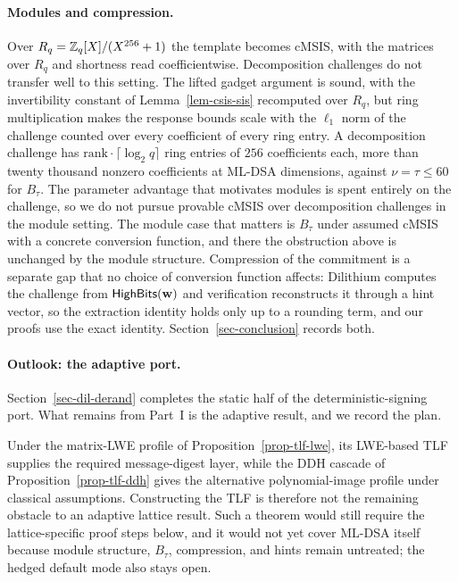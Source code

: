 \paragraph*{Modules and compression.} Over $R_q = \mathbb Z_q[X]/(X^{256}+1)$ the template becomes cMSIS, with the matrices over $R_q$ and shortness read coefficientwise. Decomposition challenges do not transfer well to this setting. The lifted gadget argument is sound, with the invertibility constant of Lemma~\ref{lem-csis-sis} recomputed over $R_q$, but ring multiplication makes the response bounds scale with the $\ell_1$ norm of the challenge counted over every coefficient of every ring entry. A decomposition challenge has $\mathrm{rank}\cdot\lceil\log_2 q\rceil$ ring entries of $256$ coefficients each, more than twenty thousand nonzero coefficients at ML-DSA dimensions, against $\nu = \tau \le 60$ for $B_\tau$. The parameter advantage that motivates modules is spent entirely on the challenge, so we do not pursue provable cMSIS over decomposition challenges in the module setting. The module case that matters is $B_\tau$ under assumed cMSIS with a concrete conversion function, and there the obstruction above is unchanged by the module structure. Compression of the commitment is a separate gap that no choice of conversion function affects: Dilithium computes the challenge from $\mathsf{HighBits}(\mathbf{w})$ and verification reconstructs it through a hint vector, so the extraction identity holds only up to a rounding term, and our proofs use the exact identity. Section~\ref{sec-conclusion} records both.

\paragraph*{Outlook: the adaptive port.} Section~\ref{sec-dil-derand} completes the static half of the deterministic-signing port. What remains from Part~I is the adaptive result, and we record the plan.

Under the matrix-LWE profile of Proposition~\ref{prop-tlf-lwe}, its LWE-based
TLF supplies the required message-digest layer, while the DDH cascade of
Proposition~\ref{prop-tlf-ddh} gives the alternative polynomial-image profile
under classical assumptions. Constructing the TLF is therefore not the
remaining obstacle to an adaptive lattice result. Such a theorem would still
require the lattice-specific proof steps below, and it
would not yet cover ML-DSA itself because module structure, $B_\tau$,
compression, and hints remain untreated; the hedged default mode also stays
open.


